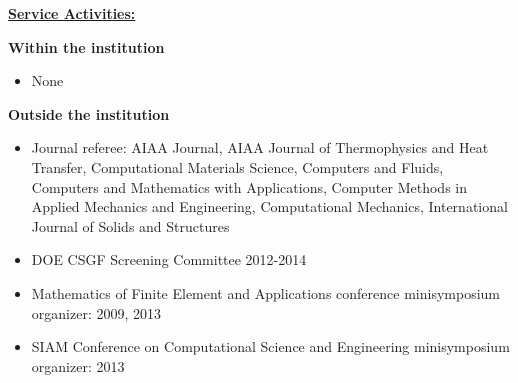 \documentclass[12pt]{article}
\newcommand{\makesection}[1]{\underline{\bfseries #1:}}
\begin{document}
\makesection{Service Activities}

\textbf{Within the institution}
\begin{itemize}
\item None
\end{itemize}

\textbf{Outside the institution}
\begin{itemize}
\item Journal referee: AIAA Journal, AIAA Journal of Thermophysics and Heat Transfer,
  Computational Materials Science, Computers and Fluids, Computers and Mathematics with Applications,
  Computer Methods in Applied Mechanics and Engineering, Computational Mechanics,
  International Journal of Solids and Structures
\item DOE CSGF Screening Committee 2012-2014
\item Mathematics of Finite Element and Applications conference minisymposium organizer: 2009, 2013
\item SIAM Conference on Computational Science and Engineering minisymposium organizer: 2013
\end{itemize}
\end{document}

